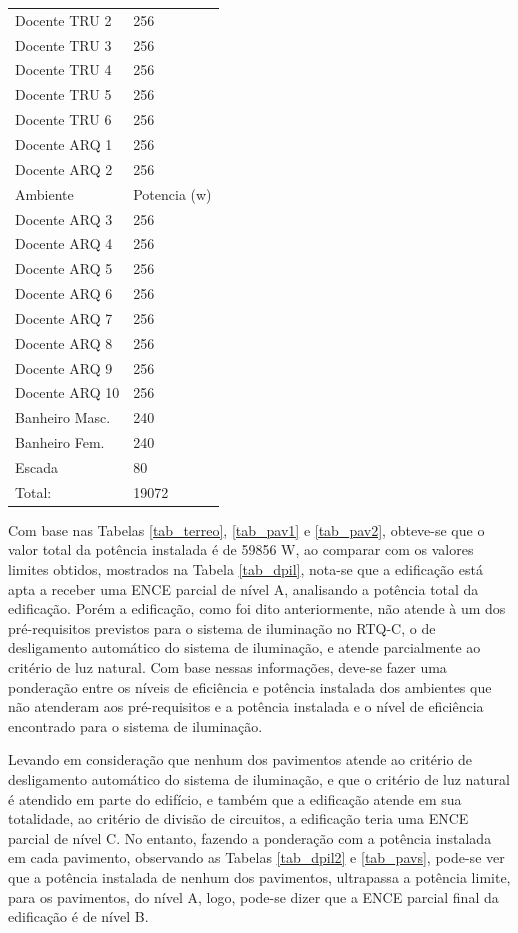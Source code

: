 \begin{longtable}[H]{ll}
Docente TRU 2 & 256 \\
Docente TRU 3 & 256 \\
Docente TRU 4 & 256 \\
Docente TRU 5 & 256 \\
Docente TRU 6 & 256 \\
Docente ARQ 1 & 256 \\
Docente ARQ 2 & 256 \\
Ambiente & Potencia (w) \\\hline
Docente ARQ 3 & 256 \\
Docente ARQ 4 & 256 \\
Docente ARQ 5 & 256 \\
Docente ARQ 6 & 256 \\
Docente ARQ 7 & 256 \\
Docente ARQ 8 & 256 \\
Docente ARQ 9 & 256 \\
Docente ARQ 10 & 256 \\
Banheiro Masc. & 240 \\
Banheiro Fem. & 240 \\
Escada & 80 \\\hline
Total: & 19072\\\hline
\end{longtable}

Com base nas Tabelas \ref{tab_terreo}, \ref{tab_pav1} e \ref{tab_pav2}, obteve-se que o valor total da potência instalada é de 59856 W, ao comparar com os valores limites obtidos, mostrados na Tabela \ref{tab_dpil}, nota-se que a edificação está apta a receber uma ENCE parcial de nível A, analisando a potência total da edificação. Porém a edificação, como foi dito anteriormente, não atende à um dos pré-requisitos previstos para o sistema de iluminação no RTQ-C, o de desligamento automático do sistema de iluminação, e atende parcialmente ao critério de luz natural. Com base nessas informações, deve-se fazer uma ponderação entre os níveis de eficiência e potência instalada dos ambientes que não atenderam aos pré-requisitos e a potência instalada e o nível de eficiência encontrado para o sistema de iluminação.

Levando em consideração que nenhum dos pavimentos atende ao critério de desligamento automático do sistema de iluminação, e que o critério de luz natural é atendido em parte do edifício, e também que a edificação atende em sua totalidade, ao critério de divisão de circuitos, a edificação teria uma ENCE parcial de nível C. No entanto, fazendo a ponderação com a potência instalada em cada pavimento, observando as Tabelas \ref{tab_dpil2} e \ref{tab_pavs}, pode-se ver que a potência instalada de nenhum dos pavimentos, ultrapassa a potência limite, para os pavimentos, do nível A, logo, pode-se dizer que a ENCE parcial final da edificação é de nível B.



